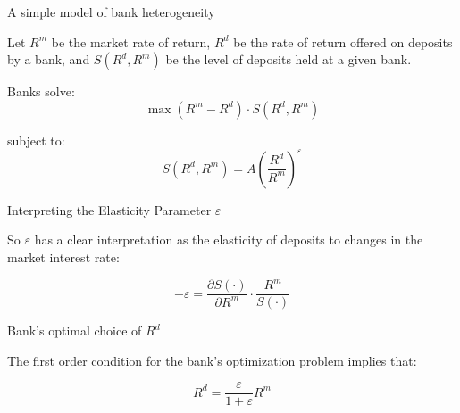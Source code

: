 \documentclass{beamer}
\begin{document}
\begin{frame}[label=bankmodel]{A simple model of bank heterogeneity}

\par Let $R^m$ be the market rate of return, $R^d$ be the rate of return offered on deposits by a  bank, and $S(R^d, R^m)$ be the level of deposits held at a given bank.

 \vspace{2.5mm}
\par Banks solve:
\[
\max (R^m - R^d) \cdot S(R^d, R^m)
\]

\par subject to:
\[
S(R^d, R^m) = A \left( \frac{R^d}{R^m} \right)^{\varepsilon}
\]

\vspace{1em}
\hyperlink{epsilonslide}{}

\end{frame}

\begin{frame}[label=epsilonslide]{Interpreting the Elasticity Parameter $\varepsilon$}

\small
\par So $\varepsilon$ has a clear interpretation as the elasticity of deposits to changes in the market interest rate:

\[
-\varepsilon = \frac{\partial S(\cdot)}{\partial R^m} \cdot \frac{R^m}{S(\cdot)}
\]

\vspace{1em}
\hyperlink{bankmodel}{}

\vspace{1em}
\hyperlink{focslide}{}

\end{frame}

\begin{frame}[label=focslide]{Bank's optimal choice of  $R^d$}

\small
\par  The first order condition for the bank's optimization problem implies that:

\[
R^d  = \frac{\varepsilon}{1+ \varepsilon} R^m 
\]

\vspace{1em}
\hyperlink{bankmodel}{}

\end{frame}
\end{document}
